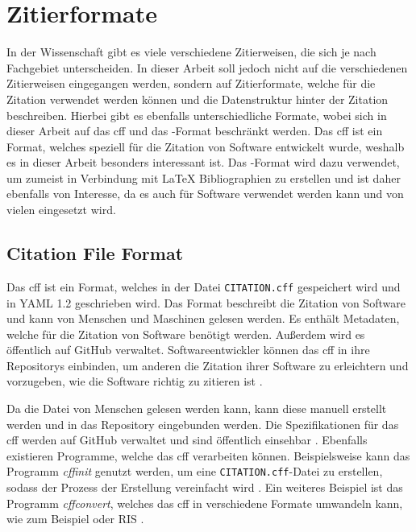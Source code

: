\section{Zitierformate}
\label{sec:zitierformate}
In der Wissenschaft gibt es viele verschiedene Zitierweisen, die sich je nach Fachgebiet unterscheiden.
In dieser Arbeit soll jedoch nicht auf die verschiedenen Zitierweisen eingegangen werden, sondern auf Zitierformate, welche für die Zitation verwendet werden können und die Datenstruktur hinter der Zitation beschreiben.
Hierbei gibt es ebenfalls unterschiedliche Formate, wobei sich in dieser Arbeit auf das \gls{cff} und das -Format beschränkt werden.
Das \gls{cff} ist ein Format, welches speziell für die Zitation von Software entwickelt wurde, weshalb es in dieser Arbeit besonders interessant ist.
Das -Format wird dazu verwendet, um zumeist in Verbindung mit \LaTeX{} Bibliographien zu erstellen und ist daher ebenfalls von Interesse, da es auch für Software verwendet werden kann und von vielen eingesetzt wird.

\subsection{Citation File Format}
\label{subsec:citation-file-format}
Das \gls{cff} ist ein Format, welches in der Datei \texttt{CITATION.cff} gespeichert wird und in YAML 1.2 geschrieben wird. 
Das Format beschreibt die Zitation von Software und kann von Menschen und Maschinen gelesen werden.
Es enthält Metadaten, welche für die Zitation von Software benötigt werden.
Außerdem wird es öffentlich auf GitHub verwaltet.
Softwareentwickler können das \gls{cff} in ihre Repositorys einbinden, um anderen die Zitation ihrer Software zu erleichtern und vorzugeben, wie die Software richtig zu zitieren ist \autocite{druskat_citation_2021}.

Da die Datei von Menschen gelesen werden kann, kann diese manuell erstellt werden und in das Repository eingebunden werden.
Die Spezifikationen für das \gls{cff} werden auf GitHub verwaltet und sind öffentlich einsehbar \autocite{druskat_citation_2021}.
Ebenfalls existieren Programme, welche das \gls{cff} verarbeiten können.
Beispielsweise kann das Programm \emph{cffinit} genutzt werden, um eine \texttt{CITATION.cff}-Datei zu erstellen, sodass der Prozess der Erstellung vereinfacht wird \autocite{spaaks_cffinit_2023}.
Ein weiteres Beispiel ist das Programm \textit{cffconvert}, welches das \gls{cff} in verschiedene Formate umwandeln kann, wie zum Beispiel  oder RIS \autocite{spaaks_cffconvert_2021}.

